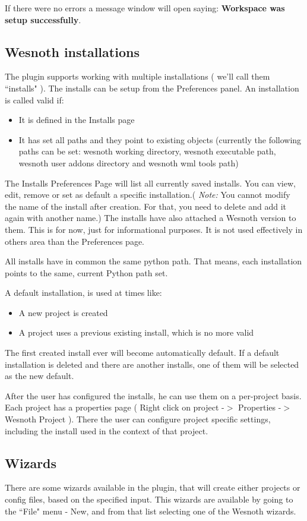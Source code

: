 \documentclass[10pt]{article}
\begin{document}
If there were no errors a message window will open saying: \textbf{Workspace was setup successfully}.

\subsection{Wesnoth installations}
The plugin supports working with multiple installations ( we'll call them ``installs" ). The installs can be setup from the Preferences panel. An installation is called valid if:
\begin{itemize}
  \item It is defined in the Installs page
  \item It has set all paths and they point to existing objects (currently the following paths can be set: wesnoth working directory, wesnoth executable path, wesnoth user addons directory and wesnoth wml tools path)
\end{itemize}

The Installs Preferences Page will list all currently saved installs. You can view, edit, remove or set as default a specific installation.( \textit{Note:} You cannot modify the name of the install after creation. For that, you need to delete and add it again with another name.) The installs have also attached a Wesnoth version to them. This is for now, just for informational purposes. It is not used effectively in others area than the Preferences page.

All installs have in common the same python path. That means, each installation points to the same, current Python path set.

A default installation, is used at times like:
\begin{itemize}
  \item A new project is created
  \item A project uses a previous existing install, which is no more valid
\end{itemize}
The first created install ever will become automatically default. If a default installation is deleted and there are another installs, one of them will be selected as the new default.

After the user has configured the installs, he can use them on a per-project basis. Each project has a properties page ( Right click on project -$>$ Properties -$>$ Wesnoth Project ). There the user can configure project specific settings, including the install used in the context of that project.

\subsection{Wizards}
There are some wizards available in the plugin, that will create either projects or config files, based on the specified input. This wizards are available by going to the ``File" menu - New, and from that list selecting one of the Wesnoth wizards.
\end{document}
